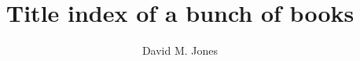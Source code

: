 \documentclass{article}
\newif\ifsmall
\begin{document}
\ifsmall
\fontsize{7.5pt}{9pt}
\fi
\selectfont

\title{Title index of a bunch of books}
\author{David M. Jones}

\maketitle


\begin{theindex}


\end{theindex}
\end{document}
